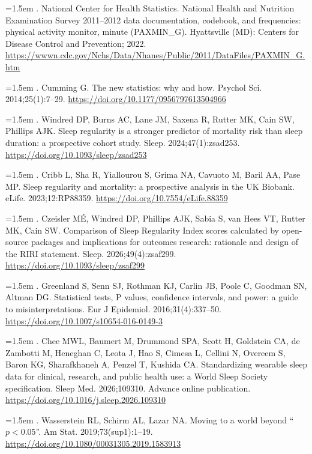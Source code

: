 \documentclass[12pt]{article}
\begin{document}
\begin{sloppypar}
\hangindent=1.5em  . National Center for Health Statistics. National Health and Nutrition Examination Survey 2011--2012 data documentation, codebook, and frequencies: physical activity monitor, minute (PAXMIN\_G). Hyattsville (MD): Centers for Disease Control and Prevention; 2022. \url{https://wwwn.cdc.gov/Nchs/Data/Nhanes/Public/2011/DataFiles/PAXMIN_G.htm}

\hangindent=1.5em  . Cumming G. The new statistics: why and how. Psychol Sci. 2014;25(1):7--29. \url{https://doi.org/10.1177/0956797613504966}

\hangindent=1.5em  . Windred DP, Burns AC, Lane JM, Saxena R, Rutter MK, Cain SW, Phillips AJK. Sleep regularity is a stronger predictor of mortality risk than sleep duration: a prospective cohort study. Sleep. 2024;47(1):zsad253. \url{https://doi.org/10.1093/sleep/zsad253}

\hangindent=1.5em  . Cribb L, Sha R, Yiallourou S, Grima NA, Cavuoto M, Baril AA, Pase MP. Sleep regularity and mortality: a prospective analysis in the UK Biobank. eLife. 2023;12:RP88359. \url{https://doi.org/10.7554/eLife.88359}

\hangindent=1.5em  . Czeisler M\'E, Windred DP, Phillips AJK, Sabia S, van Hees VT, Rutter MK, Cain SW. Comparison of Sleep Regularity Index scores calculated by open-source packages and implications for outcomes research: rationale and design of the RIRI statement. Sleep. 2026;49(4):zsaf299. \url{https://doi.org/10.1093/sleep/zsaf299}

\hangindent=1.5em  . Greenland S, Senn SJ, Rothman KJ, Carlin JB, Poole C, Goodman SN, Altman DG. Statistical tests, P values, confidence intervals, and power: a guide to misinterpretations. Eur J Epidemiol. 2016;31(4):337--50. \url{https://doi.org/10.1007/s10654-016-0149-3}

\hangindent=1.5em  . Chee MWL, Baumert M, Drummond SPA, Scott H, Goldstein CA, de Zambotti M, Heneghan C, Leota J, Hao S, Cimesa L, Cellini N, Overeem S, Baron KG, Sharafkhaneh A, Penzel T, Kushida CA. Standardizing wearable sleep data for clinical, research, and public health use: a World Sleep Society specification. Sleep Med. 2026;109310. Advance online publication. \url{https://doi.org/10.1016/j.sleep.2026.109310}

\hangindent=1.5em  . Wasserstein RL, Schirm AL, Lazar NA. Moving to a world beyond ``$p < 0.05$''. Am Stat. 2019;73(sup1):1--19. \url{https://doi.org/10.1080/00031305.2019.1583913}
\end{sloppypar}
\end{document}
